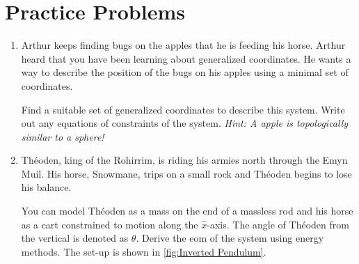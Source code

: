 \section{Practice Problems}
\begin{enumerate}
    \item Arthur keeps finding bugs on the apples that he is feeding his horse. Arthur heard that you have been learning about generalized coordinates. He wants a way to describe the position of the bugs on his apples using a minimal set of coordinates.

Find a suitable set of generalized coordinates to describe this system. Write out any equations of constraints of the system. \textit{Hint: A apple is topologically similar to a sphere!}

\item  Th\'eoden, king of the Rohirrim, is riding his armies north through the Emyn Muil. His horse, Snowmane, trips on a small rock and Th\'eoden begins to lose his balance.

You can model Th\'eoden as a mass on the end of a massless rod and his horse as a cart constrained to motion along the $\hat{x}$-axis. The angle of Th\'eoden from the vertical is denoted as $\theta$. Derive the \gls{eom} of the system using energy methods. The set-up is shown in \autoref{fig:Inverted Pendulum}.
\begin{figure}[ht]
    \centering


\begin{tikzpicture}[x=0.75pt,y=0.75pt,yscale=-1,xscale=1]


\end{tikzpicture}
\end{figure}
\end{enumerate}
